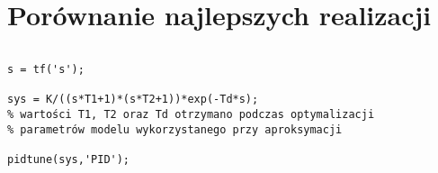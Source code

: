 \begin{figure}[H]
\centering

\end{figure}

\begin{figure}[H]
\centering

\end{figure}

\begin{figure}[H]
\centering

\end{figure}

\chapter{Porównanie najlepszych realizacji}


\begin{figure}[H]
\centering

\end{figure}

\begin{figure}[H]
\centering

\end{figure}

\begin{figure}[H]
\centering

\end{figure}


\begin{figure}[H]
\centering

\end{figure}


\begin{figure}[H]
\centering

\end{figure}



\begin{equation}
\end{equation}


\begin{lstlisting}[style=Matlab-editor]
s = tf('s');

sys = K/((s*T1+1)*(s*T2+1))*exp(-Td*s);
% wartości T1, T2 oraz Td otrzymano podczas optymalizacji
% parametrów modelu wykorzystanego przy aproksymacji

pidtune(sys,'PID');
\end{lstlisting} 

